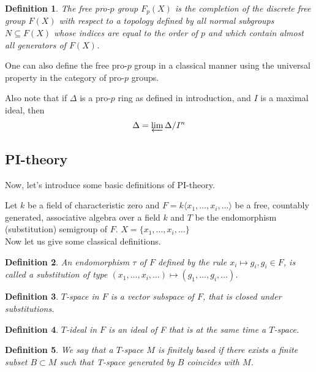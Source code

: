 \documentclass[12pt,a4paper]{article}
\newtheorem{definition}{Definition}[subsection]
\begin{document}
    \vskip 0.1in\noindent
    \begin{definition}
        The free pro-$p$ group $F_p(X)$ is the completion of the discrete free group $F(X)$ with respect to a topology defined by all normal subgroups $N \subseteq F(X)$ whose indices are equal to the order of $p$ and which contain almost all generators of $F(X)$.
    \end{definition}
    \vskip 0.1in\noindent

    One can also define the free pro-$p$ group in a classical manner using the universal property in the category of pro-$p$ groups.

    Also note that if $\Delta$ is a pro-$p$ ring as defined in introduction, and $I$ is a maximal ideal, then
    \[ \Delta = \varprojlim \Delta/I^n \]

    \subsection{PI-theory}
    Now, let's introduce some basic definitions of PI-theory.

    Let $k$ be a field of characteristic zero and $F = k\langle x_1,\ldots,x_i,\ldots\rangle$ be a free, countably generated, associative algebra over a field $k$ and $T$ be the endomorphism (substitution) semigroup of $F$. $X = \{ x_1,\ldots,x_i,\ldots\}$\\
    Now let us give some classical definitions.

    \vskip 0.1in\noindent
    \begin{definition}
        An endomorphism $\tau$ of $F$ defined by the rule $x_i \mapsto g_i, g_i \in F$, is called a substitution of type
        $(x_1,\ldots,x_i,\ldots) \mapsto (g_1,\ldots,g_i,\ldots)$.
    \end{definition}
    \vskip 0.1in\noindent

    \vskip 0.1in\noindent
    \begin{definition}
        $T$-space in $F$ is a vector subspace of $F$, that is closed under substitutions.
    \end{definition}
    \vskip 0.1in\noindent

    \vskip 0.1in\noindent
    \begin{definition}
        $T$-ideal in $F$ is an ideal of F that is at the same time a $T$-space.
    \end{definition}
    \vskip 0.1in\noindent

    \vskip 0.1in\noindent
    \begin{definition}
        We say that a $T$-space $M$ is finitely based if there exists a finite subset $B\subset M$ such that T-space generated by $B$ coincides with $M$.
    \end{definition}
    \vskip 0.1in\noindent
\end{document}
